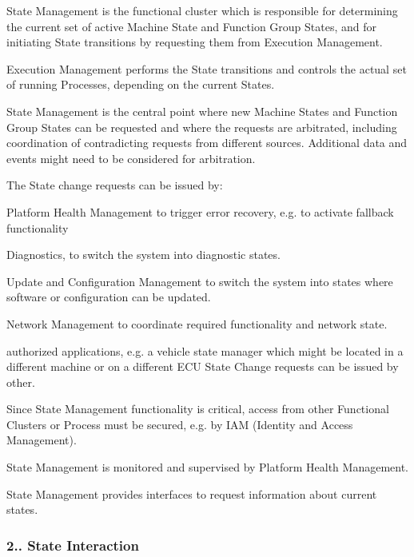 \begin{DoxyItemize}
\item State Management is the functional cluster which is responsible for determining the current set of active Machine State and Function Group States, and for initiating State transitions by requesting them from Execution Management.
\item Execution Management performs the State transitions and controls the actual set of running Processes, depending on the current States.
\item State Management is the central point where new Machine States and Function Group States can be requested and where the requests are arbitrated, including coordination of contradicting requests from different sources. Additional data and events might need to be considered for arbitration.
\item The State change requests can be issued by\+:
\begin{DoxyItemize}
\item Platform Health Management to trigger error recovery, e.\+g. to activate fallback functionality
\item Diagnostics, to switch the system into diagnostic states.
\item Update and Configuration Management to switch the system into states where software or configuration can be updated.
\item Network Management to coordinate required functionality and network state.
\item authorized applications, e.\+g. a vehicle state manager which might be located in a different machine or on a different E\+CU State Change requests can be issued by other.
\end{DoxyItemize}
\item Since State Management functionality is critical, access from other Functional Clusters or Process must be secured, e.\+g. by I\+AM (Identity and Access Management).
\item State Management is monitored and supervised by Platform Health Management.
\item State Management provides interfaces to request information about current states.
\end{DoxyItemize}

\subsubsection*{2.. {\bfseries State Interaction}}


